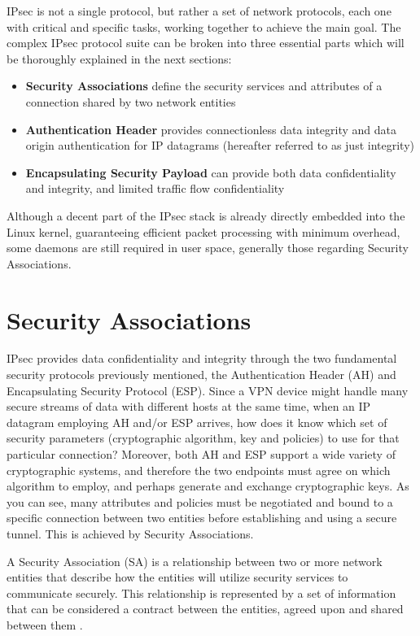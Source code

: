 \documentclass[a4paper,12pt]{report}
\begin{document}
		IPsec is not a single protocol, but rather a set of network protocols, each one with critical and specific tasks, working together to achieve the main goal. The complex IPsec protocol suite can be broken into three essential parts which will be thoroughly explained in the next sections:
		\begin{itemize}
			\item \textbf{Security Associations} define the security services and attributes of a connection shared by two network entities
			\item \textbf{Authentication Header} provides connectionless data integrity and data origin authentication for IP datagrams (hereafter referred to as just integrity) \cite{rfc4302}
			\item \textbf{Encapsulating Security Payload} can provide both data confidentiality and integrity, and limited traffic flow confidentiality \cite{rfc2406}
		\end{itemize}
		
		Although a decent part of the IPsec stack is already directly embedded into the Linux kernel, guaranteeing efficient packet processing with minimum overhead, some daemons are still required in user space, generally those regarding Security Associations.
		
	\section{Security Associations}
	IPsec provides data confidentiality and integrity through the two fundamental security protocols previously mentioned, the Authentication Header (AH) and Encapsulating Security Protocol (ESP). Since a VPN device might handle many secure streams of data with different hosts at the same time, when an IP datagram employing AH and/or ESP arrives, how does it know which set of security parameters (cryptographic algorithm, key and policies) to use for that particular connection? Moreover, both AH and ESP support a wide variety of cryptographic systems, and therefore the two endpoints must agree on which algorithm to employ, and perhaps generate and exchange cryptographic keys. As you can see, many attributes and policies must be negotiated and bound to a specific connection between two entities before establishing and using a secure tunnel. This is achieved by Security Associations. 
	
	A Security Association (SA) is a relationship between two or more network entities that describe how the entities will utilize security services to communicate securely. This relationship is represented by a set of information that can be considered a contract between the entities, agreed upon and shared between them \cite{rfc2408}. 
	
\end{document}

